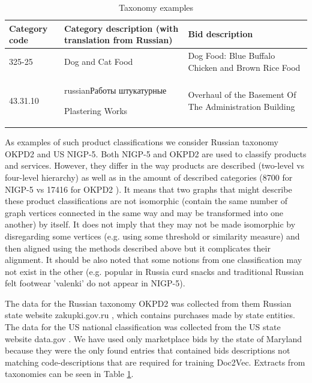 \documentclass[11pt,a4paper]{article}
\begin{document}
\begin{center}
	\begin{table}[!htbp]
		\small
		\caption{Taxonomy examples}
		\label{table-taxonomies}		
		\centering
		\begin{tabular}{|p{1cm}|p{2.5cm}|p{2.5cm}|}
			\hline
			Category code & Category description \newline (with translation from Russian) & Bid description\\
			\hline
			325-25 & Dog and Cat Food & Dog Food: Blue Buffalo Chicken and Brown Rice Food\\
			\hline
			43.31.10 & \begin{otherlanguage*}{russian}Работы штукатурные\end{otherlanguage*} \newline Plastering Works & Overhaul of the Basement Of The Administration Building\\
			\hline
		\end{tabular}
	\end{table}
\end{center}

As examples of such product classifications we consider Russian taxonomy OKPD2 and US NIGP-5.
Both NIGP-5 and OKPD2 are used to classify products and services. However, they differ in the way products are described (two-level vs four-level hierarchy) as well as in the amount of described categories (8700 for NIGP-5 \cite{wiki-nigp} vs 17416 for OKPD2 \cite{wiki-okpd}). It means that two graphs that might describe these product classifications are not isomorphic (contain the same number of graph vertices connected in the same way and may be transformed into one another) by itself.  It does not imply that they may not be made isomorphic by disregarding some vertices (e.g. using some threshold or similarity measure) and then aligned using the methods described above but it complicates their alignment. It should be also noted that some notions from one classification may not exist in the other (e.g. popular in Russia curd snacks and traditional Russian felt footwear 'valenki' do not appear in NIGP-5).

The data for the Russian taxonomy OKPD2 was collected from them Russian state website zakupki.gov.ru \cite{gos-zakupki}, which contains purchases made by state entities.
The data for the US national classification was collected from the US state website data.gov \cite{data-gov}. We have used only marketplace bids by the state of Maryland because they were the only found entries that contained bids descriptions not matching code-descriptions that are required for training Doc2Vec. Extracts from taxonomies can be seen in Table \ref{table-taxonomies}.
\end{document}
